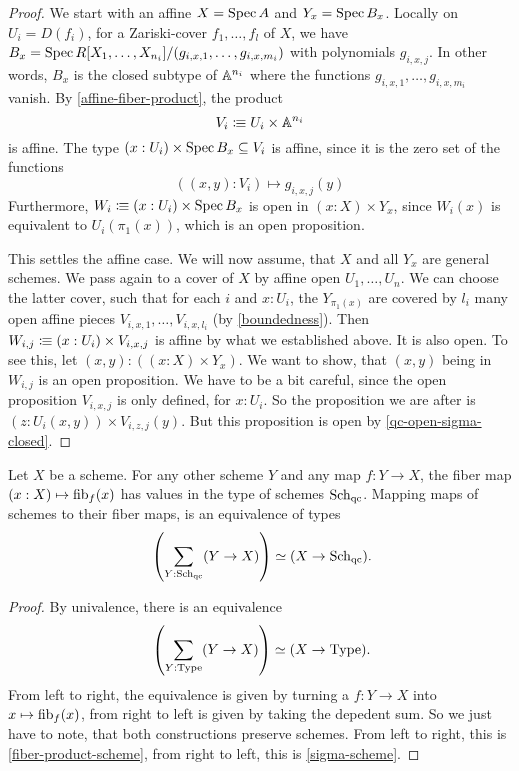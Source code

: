 \begin{proof}
  We start with an affine $X=\operatorname{Spec} A$ and $Y_x=\operatorname{Spec} B_x$.
  Locally on $U_i = D(f_i)$, for a Zariski-cover $f_1,\dots,f_l$ of $X$,
  we have $B_x=\operatorname{Spec} R[X_1,\dots,X_{n_i}]/(g_{i,x,1},\dots,g_{i,x,m_i})$
  with polynomials $g_{i,x,j}$.
  In other words, $B_x$ is the closed subtype of $\mathbb{A}^{n_i}$
  where the functions $g_{i,x,1},\dots,g_{i,x,m_i}$ vanish.
  By \cref{affine-fiber-product}, the product
  \[ V_i\vcentcolon\mspace{-1.2mu}\equiv U_i\times \mathbb{A}^{n_i}\]
  is affine.
  The type $(x:U_i)\times \operatorname{Spec} B_x\subseteq V_i$ is affine,
  since it is the zero set of the functions
  \[ ((x,y):V_i)\mapsto g_{i,x,j}(y) \]
  Furthermore, $W_i\vcentcolon\mspace{-1.2mu}\equiv (x:U_i)\times \operatorname{Spec} B_x$
  is open in $(x:X)\times Y_x$,
  since $W_i(x)$ is equivalent to $U_i(\pi_1(x))$,
  which is an open proposition.

  This settles the affine case.
  We will now assume, that
  $X$ and all $Y_x$ are general schemes.
  We pass again to a cover of $X$ by affine open $U_1,\dots,U_n$.
  We can choose the latter cover,
  such that for each $i$ and $x:U_i$, the $Y_{\pi_1(x)}$
  are covered by $l_i$ many open affine pieces $V_{i,x,1},\dots,V_{i,x,l_i}$
  (by \cref{boundedness}).
  Then $W_{i,j}\vcentcolon\mspace{-1.2mu}\equiv(x:U_i)\times V_{i,x,j}$ is affine by what we established above.
  It is also open.
  To see this, let $(x,y):((x:X)\times Y_x)$.
  We want to show, that $(x,y)$ being in $W_{i,j}$ is an open proposition.
  We have to be a bit careful, since the open proposition
  $V_{i,x,j}$ is only defined, for $x:U_i$.
  So the proposition we are after is $(z:U_i(x,y))\times V_{i,z,j}(y)$.
  But this proposition is open by \cref{qc-open-sigma-closed}.
\end{proof}

\begin{corollary}
  \label{scheme-map-classification}
  Let $X$ be a scheme.
  For any other scheme $Y$ and any map $f:Y\to X$,
  the fiber map
  $(x:X)\mapsto \mathrm{fib}_f(x)$
  has values in the type of schemes $\operatorname{\mathrm{Sch}_{qc}}$.
  Mapping maps of schemes to their fiber maps,
  is an equivalence of types
  \[ \left(\sum_{Y:\Sch}(Y\to X)\right)\simeq (X\to \Sch)\rlap{.}\]
\end{corollary}

\begin{proof}
  By univalence, there is an equivalence
  \[ \left(\sum_{Y:\Type}(Y\to X)\right)\simeq (X\to \Type)\rlap{.} \]
  From left to right, the equivalence is given by turning a $f:Y\to X$ into $x\mapsto \mathrm{fib}_f(x)$,
  from right to left is given by taking the depedent sum.
  So we just have to note, that both constructions preserve schemes.
  From left to right, this is \cref{fiber-product-scheme}, from right to left,
  this is \cref{sigma-scheme}.
\end{proof}


